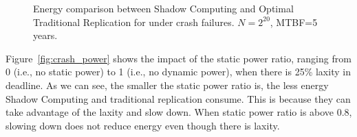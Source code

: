 \begin{figure}[!t]
	\begin{center}
	\end{center}
	\caption{Energy comparison between Shadow Computing and Optimal Traditional Replication for under crash failures. $N=2^{20}$, MTBF=5 years.}
	\label{fig:crash_eval}
    \vspace{-0.2in}
\end{figure}

Figure~\ref{fig:crash_power} shows the impact of the static power ratio, ranging from 0 (i.e., no static power) to 1 (i.e., no dynamic power), when there is 25\% laxity in deadline. As we can see, the smaller the static power ratio is, the less energy Shadow Computing and traditional replication consume. This is because they can take advantage of the laxity and slow down. When static power ratio is above 0.8, slowing down does not reduce energy even though there is laxity. 

